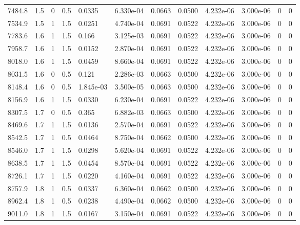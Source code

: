 \documentclass[preview]{standalone}
\begin{document}
{{{\begin{tabular}{L{1.2cm}C{1.2cm} C{0.3cm}C{0.5cm} C{1.4cm}C{1.4cm} C{1.4cm}C{1.4cm} C{1.6cm}C{1.6cm} C{1.6cm}C{1.6cm}}
  7484.8  &   1.5  & 0     & 0.5 &  0.0335  & 6.330e-04  &  0.0663&   0.0500& 4.232e-06 & 3.000e-06   &  0 & 0  \\ 
  7534.9  &   1.5  & 1     & 1.5 &  0.0251  & 4.740e-04  &  0.0691&   0.0522& 4.232e-06 & 3.000e-06   &  0 & 0  \\ 
  7783.6  &   1.6  & 1     & 1.5 &  0.166  & 3.125e-03  &  0.0691&   0.0522& 4.232e-06 & 3.000e-06   &  0 & 0  \\ 
  7958.7  &   1.6  & 1     & 1.5 &  0.0152  & 2.870e-04  &  0.0691&   0.0522& 4.232e-06 & 3.000e-06   &  0 & 0  \\ 
  8018.0  &   1.6  & 1     & 1.5 &  0.0459  & 8.660e-04  &  0.0691&   0.0522& 4.232e-06 & 3.000e-06   &  0 & 0  \\ 
  8031.5  &   1.6  & 0     & 0.5 &  0.121  & 2.286e-03  &  0.0663&   0.0500& 4.232e-06 & 3.000e-06   &  0 & 0  \\ 
  8148.4  &   1.6  & 0     & 0.5 &  1.845e-03  & 3.500e-05  &  0.0663&   0.0500& 4.232e-06 & 3.000e-06   &  0 & 0  \\ 
  8156.9  &   1.6  & 1     & 1.5 &  0.0330  & 6.230e-04  &  0.0691&   0.0522& 4.232e-06 & 3.000e-06   &  0 & 0  \\ 
  8307.5  &   1.7  & 0     & 0.5 &  0.365  & 6.882e-03  &  0.0663&   0.0500& 4.232e-06 & 3.000e-06   &  0 & 0  \\ 
  8469.6  &   1.7  & 1     & 1.5 &  0.0136  & 2.570e-04  &  0.0691&   0.0522& 4.232e-06 & 3.000e-06   &  0 & 0  \\ 
  8542.5  &   1.7  & 1     & 0.5 &  0.0464  & 8.750e-04  &  0.0662&   0.0500& 4.232e-06 & 3.000e-06   &  0 & 0  \\ 
  8546.0  &   1.7  & 1     & 1.5 &  0.0298  & 5.620e-04  &  0.0691&   0.0522& 4.232e-06 & 3.000e-06   &  0 & 0  \\ 
  8638.5  &   1.7  & 1     & 1.5 &  0.0454  & 8.570e-04  &  0.0691&   0.0522& 4.232e-06 & 3.000e-06   &  0 & 0  \\ 
  8726.1  &   1.7  & 1     & 1.5 &  0.0220  & 4.160e-04  &  0.0691&   0.0522& 4.232e-06 & 3.000e-06   &  0 & 0  \\ 
  8757.9  &   1.8  & 1     & 0.5 &  0.0337  & 6.360e-04  &  0.0662&   0.0500& 4.232e-06 & 3.000e-06   &  0 & 0  \\ 
  8962.4  &   1.8  & 1     & 0.5 &  0.0238  & 4.490e-04  &  0.0662&   0.0500& 4.232e-06 & 3.000e-06   &  0 & 0  \\ 
  9011.0  &   1.8  & 1     & 1.5 &  0.0167  & 3.150e-04  &  0.0691&   0.0522& 4.232e-06 & 3.000e-06   &  0 & 0  \\ 

\end{tabular}}}}
\end{document}

